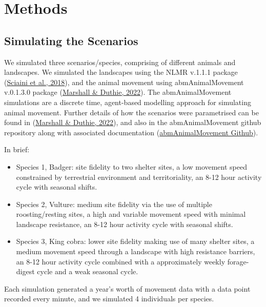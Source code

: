\documentclass[10pt,a4paper]{article}
\begin{document}
\hypertarget{methods}{%
\section{Methods}\label{methods}}

\hypertarget{simulating-the-scenarios}{%
\subsection{Simulating the Scenarios}\label{simulating-the-scenarios}}

We simulated three scenarios/species, comprising of different animals and landscapes.
We simulated the landscapes using the NLMR v.1.1.1 package (\protect\hyperlink{ref-NLMR}{Sciaini et al., 2018}), and the animal movement using abmAnimalMovement v.0.1.3.0 package (\protect\hyperlink{ref-abmAnimalMovement}{Marshall \& Duthie, 2022}).
The abmAnimalMovement simulations are a discrete time, agent-based modelling approach for simulating animal movement.
Further details of how the scenarios were parametrised can be found in (\protect\hyperlink{ref-abmAnimalMovement}{Marshall \& Duthie, 2022}), and also in the abmAnimalMovement github repository along with associated documentation (\href{https://github.com/BenMMarshall/abmAnimalMovement/tree/main/notebook/manuscript}{abmAnimalMovement Github}).

In brief:

\begin{itemize}
\item
  Species 1, Badger: site fidelity to two shelter sites, a low movement speed constrained by terrestrial environment and territoriality, an 8-12 hour activity cycle with seasonal shifts.
\item
  Species 2, Vulture: medium site fidelity via the use of multiple roosting/resting sites, a high and variable movement speed with minimal landscape resistance, an 8-12 hour activity cycle with seasonal shifts.
\item
  Species 3, King cobra: lower site fidelity making use of many shelter sites, a medium movement speed through a landscape with high resistance barriers, an 8-12 hour activity cycle combined with a approximately weekly forage-digest cycle and a weak seasonal cycle.
\end{itemize}

Each simulation generated a year's worth of movement data with a data point recorded every minute, and we simulated 4 individuals per species.
\end{document}
